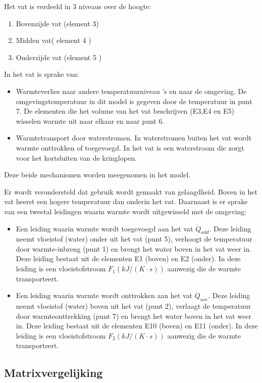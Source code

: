 Het vat is verdeeld in 3 niveaus over de hoogte:
\begin{enumerate}
	\item Bovenzijde vat (element 3)
	\item Midden vat( element 4 )
	\item Onderzijde vat (element 5 )
\end{enumerate}

In het vat is sprake van:
\begin{itemize}
	\item Warmteverlies naar andere temperatuurniveau ’s en naar de omgeving. De
	omgevingstemperatuur in dit model is gegeven door de temperatuur in punt 7.
	De elementen die het volume van het vat beschrijven (E3,E4 en E5) wisselen warmte uit naar
	elkaar en naar punt 6.
	\item Warmtetransport door waterstromen. In waterstromen buiten het vat wordt warmte
	onttrokken of toegevoegd. In het vat is een waterstroom die zorgt voor het kortsluiten van
	de kringlopen.
\end{itemize}

Deze beide mechanismen worden meegenomen in het model.

Er wordt verondersteld dat gebruik wordt gemaakt van gelaagdheid. Boven in het vat heerst een
hogere temperatuur dan onderin het vat. Daarnaast is er sprake van een tweetal leidingen waarin
warmte wordt uitgewisseld met de omgeving:

\begin{itemize}
	\item Een leiding waarin warmte wordt toegevoegd aan het vat $\dot{Q}_{add}$. Deze leiding neemt
	vloeistof (water) onder uit het vat (punt 5), verhoogt de temperatuur door warmte-inbreng
	(punt 1) en brengt het water boven in het vat weer in. Deze leiding bestaat uit de
	elementen E1 (boven) en E2 (onder). In deze leiding is een vloeistofstroom $F_1 (kJ/(K·s))$
	aanwezig die de warmte transporteert.
	\item Een leiding waarin warmte wordt onttrokken aan het vat $\dot{Q}_{use}$. Deze leiding neemt vloeistof (water) boven uit het vat (punt 2), verlaagt de temperatuur door warmteonttrekking (punt 7) en brengt het water boven in het vat weer in. Deze leiding bestaat uit	de elementen E10 (boven) en E11 (onder). In deze leiding is een vloeistofstroom $F_2 (kJ/(K·s))$ aanwezig die de warmte transporteert.
\end{itemize}

\subsection{Matrixvergelijking}

